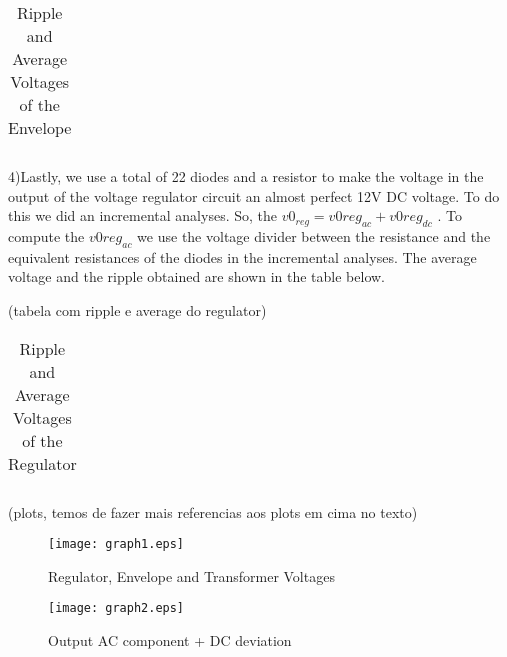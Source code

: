  
 \par
 \begin{table}[!h]
\centering
\begin{tabularx}{0.6\textwidth} {
  | >{\raggedright\arraybackslash}X
  | >{\raggedleft\arraybackslash}X | }
 \hline

\end{tabularx}
\caption{Ripple and Average Voltages of the Envelope}
\end{table}
 \par
 4)Lastly, we use a total of 22 diodes and a resistor to make the voltage in the output of the voltage regulator circuit an almost perfect 12V DC voltage. To do this we did an incremental analyses. So, the $v0_{reg} = v0reg_{ac} + v0reg_{dc}$ . To compute the $v0reg_{ac}$ we use the voltage divider between the resistance and the equivalent resistances of the diodes in the incremental analyses. The average voltage and the ripple obtained are shown in the table below.
 
 \par (tabela com ripple e average do regulator)
\begin{table}[h]
\centering
\begin{tabularx}{0.6\textwidth} {
  | >{\raggedright\arraybackslash}X
  | >{\raggedleft\arraybackslash}X | }
 \hline

\end{tabularx}
\caption{Ripple and Average Voltages of the Regulator}
\end{table}
 \par
 (plots, temos de fazer mais referencias aos plots em cima no texto)
 
 \begin{figure}[!h]\centering
\texttt{[image: graph1.eps]}
\caption{Regulator, Envelope and Transformer Voltages}
\label{fig:snat}
\end{figure}

\begin{figure}[!h]\centering
\texttt{[image: graph2.eps]}
\caption{Output AC component + DC deviation}
\label{fig:snat2}
\end{figure}

